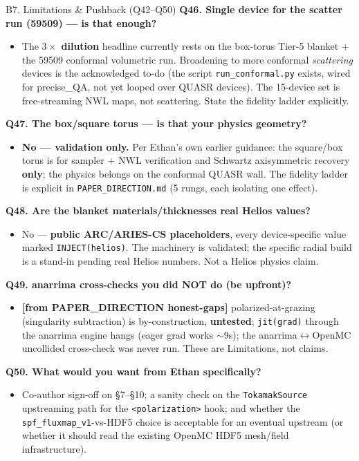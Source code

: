 \documentclass[11pt,aspectratio=169]{beamer}
\newcommand{\qitem}[1]{\medskip\textbf{#1}\par}
\begin{document}
\begin{frame}[allowframebreaks]{B7. Limitations \& Pushback (Q42--Q50)}
\qitem{Q46. Single device for the scatter run (59509) --- is that enough?}
\begin{itemize}
\item The \textbf{$3\times$ dilution} headline currently rests on the box-torus Tier-5 blanket
      $+$ the 59509 conformal volumetric run. Broadening to more conformal \emph{scattering}
      devices is the acknowledged to-do (the script \texttt{run\_conformal.py} exists, wired
      for precise\_QA, not yet looped over QUASR devices). The 15-device set is free-streaming
      NWL maps, not scattering. State the fidelity ladder explicitly.
\end{itemize}

\qitem{Q47. The box/square torus --- is that your physics geometry?}
\begin{itemize}
\item \textbf{No --- validation only.} Per Ethan's own earlier guidance: the square/box torus
      is for sampler $+$ NWL verification and Schwartz axisymmetric recovery \textbf{only}; the
      physics belongs on the conformal QUASR wall. The fidelity ladder is explicit in
      \texttt{PAPER\_DIRECTION.md} (5 rungs, each isolating one effect).
\end{itemize}

\framebreak
\qitem{Q48. Are the blanket materials/thicknesses real Helios values?}
\begin{itemize}
\item No --- \textbf{public ARC/ARIES-CS placeholders}, every device-specific value marked
      \texttt{INJECT(helios)}. The machinery is validated; the specific radial build is a
      stand-in pending real Helios numbers. Not a Helios physics claim.
\end{itemize}

\qitem{Q49. anarrima cross-checks you did NOT do (be upfront)?}
\begin{itemize}
\item \textbf{[from PAPER\_DIRECTION honest-gaps]} polarized-at-grazing (singularity
      subtraction) is by-construction, \textbf{untested}; \texttt{jit(grad)} through the
      anarrima engine hangs (eager grad works $\sim 9$s); the anarrima$\leftrightarrow$OpenMC
      uncollided cross-check was never run. These are Limitations, not claims.
\end{itemize}

\qitem{Q50. What would you want from Ethan specifically?}
\begin{itemize}
\item Co-author sign-off on \S7--\S10; a sanity check on the \texttt{TokamakSource} upstreaming
      path for the \texttt{<polarization>} hook; and whether the
      \texttt{spf\_fluxmap\_v1}-vs-HDF5 choice is acceptable for an eventual upstream (or
      whether it should read the existing OpenMC HDF5 mesh/field infrastructure).
\end{itemize}
\end{frame}
\end{document}
